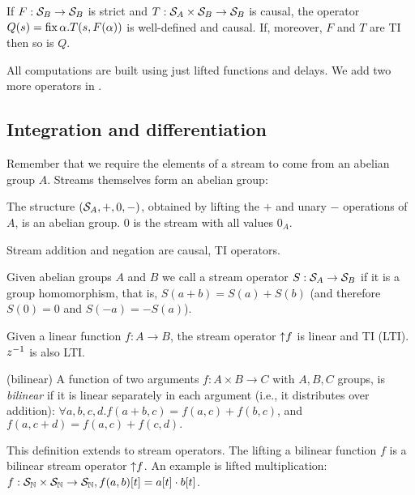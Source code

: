 \begin{lemma}\label{feedback-semantics}
\label{cor-loop}
If $F: \mathcal{S}_{B} \to \mathcal{S}_{B}$ is strict and $T: \mathcal{S}_{A} \times \mathcal{S}_{B} \to \mathcal{S}_{B}$ is causal,
the operator $Q(s)=\mbox{fix}\,\alpha.T(s,F(\alpha))$ is well-defined and causal.
If, moreover, $F$ and $T$ are TI then so is $Q$.
\end{lemma}

All \dbsp computations are built using just lifted functions and
delays.  We add two more operators in .

\subsection{Integration and differentiation}\label{sec:abelianstreams}

Remember that we require the elements of a stream to come from an abelian group $A$.
Streams themselves form an abelian group:

\begin{proposition}
The structure $(\mathcal{S}_{A},+,0,-)$, obtained by lifting the $+$ and unary $-$ operations of $A$,
is an abelian group.  0 is the stream with all values $0_A$.
\end{proposition}

\noindent
Stream addition and negation are causal, TI operators.

\begin{definition}
Given abelian groups $A$ and $B$ we call a stream operator
$S: \mathcal{S}_{A} \rightarrow \mathcal{S}_{B}$  if it is a group homomorphism, that is,
$S(a+b)=S(a)+S(b)$ (and therefore $S(0)=0$ and $S(-a)=-S(a)$).
\end{definition}

Given a linear function $f: A \to B$, the stream operator ${\uparrow}f$
is linear and TI (LTI).  $z^{-1}$ is also LTI.

\begin{definition}(bilinear)
A function of two arguments $f: A \times B \to C$ with $A, B, C$ groups, is \emph{bilinear}
if it is linear separately in each argument (i.e., it distributes over addition):
$\forall a, b, c, d . f(a+b, c) = f(a, c) + f(b, c)$, and $f(a, c+d) = f(a, c) + f(c, d).$
\end{definition}

This definition extends to stream operators.
The lifting a bilinear function $f$ is
a bilinear stream operator ${\uparrow}f$.  An example
is lifted multiplication:
$f: \mathcal{S}_{\mathbb{N}} \times \mathcal{S}_{\mathbb{N}} \to \mathcal{S}_{\mathbb{N}}, f(a, b)[t] = a[t]\cdot b[t]$.

